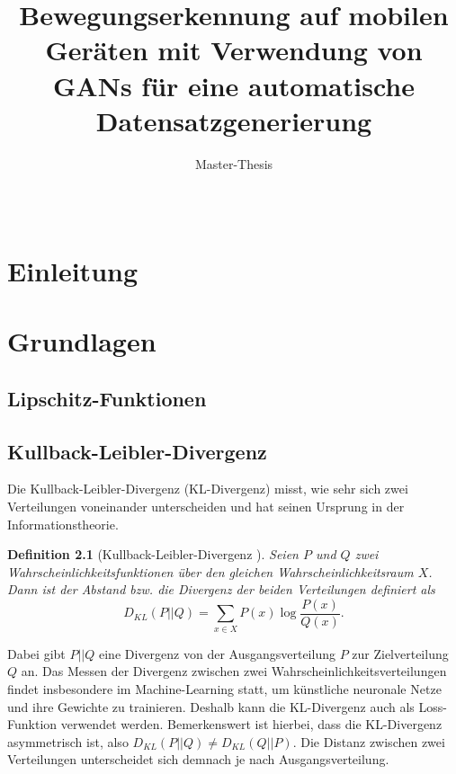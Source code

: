 \documentclass{hsflensburg}
\title{Bewegungserkennung auf mobilen Geräten mit Verwendung von GANs für eine automatische Datensatzgenerierung}
\subtitle{Master-Thesis}
\author{
  \name{Florian Hansen}\\
  \institution{Hochschule Flensburg}
}
\newtheorem{definition}{Definition}
\begin{document}
  \maketitle
  \tableofcontents

  \chapter{Einleitung}

  \chapter{Grundlagen}
  \section{Lipschitz-Funktionen}

  \section{Kullback-Leibler-Divergenz}
  Die Kullback-Leibler-Divergenz (KL-Divergenz) misst, wie sehr sich zwei
  Verteilungen voneinander unterscheiden und hat seinen Ursprung in der
  Informationstheorie. 
  \begin{definition}[Kullback-Leibler-Divergenz \cite{arjovsky2017wasserstein}]
    Seien $P$ und $Q$ zwei Wahrscheinlichkeitsfunktionen über den gleichen
    Wahrscheinlichkeitsraum $X$. Dann ist der Abstand bzw. die Divergenz der
    beiden Verteilungen definiert als
    \[
      D_{KL}(P \lvert\lvert Q) = \sum_{x \in X} P(x) \log \frac{P(x)}{Q(x)}.
    \]
  \end{definition}
  Dabei gibt $P \lvert\lvert Q$ eine Divergenz von der Ausgangsverteilung $P$
  zur Zielverteilung $Q$ an. Das Messen der Divergenz zwischen zwei
  Wahrscheinlichkeitsverteilungen findet insbesondere im Machine-Learning statt,
  um künstliche neuronale Netze und ihre Gewichte zu trainieren. Deshalb kann
  die KL-Divergenz auch als Loss-Funktion verwendet werden. Bemerkenswert ist
  hierbei, dass die KL-Divergenz asymmetrisch ist, also $D_{KL}(P \lvert\lvert
  Q) \neq D_{KL}(Q \lvert\lvert P)$. Die Distanz zwischen zwei Verteilungen
  unterscheidet sich demnach je nach Ausgangsverteilung.
\end{document}
